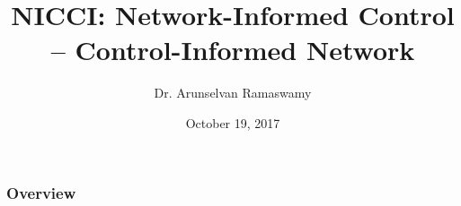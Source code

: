 \documentclass{beamer}
\title[NICCI]{NICCI: Network-Informed Control -- Control-Informed Network} %
\author[Arun]{Dr. Arunselvan Ramaswamy %
 } %
\institute[Paderborn University] %
{
Dept. of Electrical Engineering and Information Technology, \\
Paderborn University \\ %
\textit{arunselvan.ramaswamy@upb.de}\\
}
\date{October 19, 2017} %
\begin{document}
\begin{frame}
\titlepage %
\end{frame}

\begin{frame}
\frametitle{Overview} %
\tableofcontents %
\end{frame}
\end{document}
